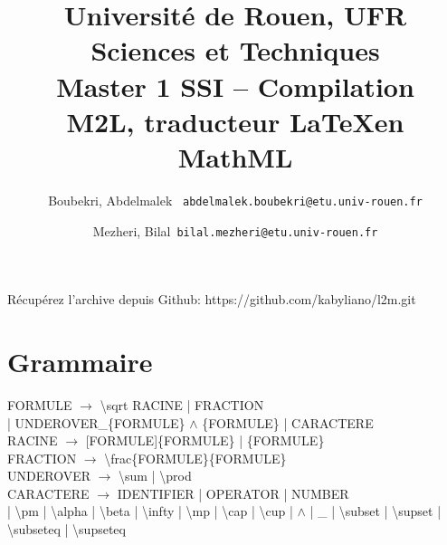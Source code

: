 \documentclass[12pt,a4paper]{article}
\author{
	Boubekri, Abdelmalek \     \texttt{abdelmalek.boubekri@etu.univ-rouen.fr}
	\and
	Mezheri, Bilal\   		   \texttt{bilal.mezheri@etu.univ-rouen.fr}
}
\title{	Université de Rouen, UFR Sciences et Techniques\\
		Master 1 SSI – Compilation\\
		M2L, traducteur \LaTeX en MathML\\ }
\begin{document}
	
	\maketitle

Récupérez l'archive depuis Github: https://github.com/kabyliano/l2m.git

\section*{Grammaire}

FORMULE 	$\rightarrow$ \textbackslash sqrt RACINE | FRACTION \\
 
 | UNDEROVER\_\{FORMULE\} $\wedge$ \{FORMULE\} | CARACTERE\\
 
RACINE		$\rightarrow$ [FORMULE]\{FORMULE\} | \{FORMULE\}\\

FRACTION	$\rightarrow$ \textbackslash frac\{FORMULE\}\{FORMULE\}\\

UNDEROVER	$\rightarrow$ \textbackslash sum | \textbackslash prod \\

CARACTERE	$\rightarrow$ IDENTIFIER | OPERATOR | NUMBER\\
 | \textbackslash pm | \textbackslash alpha | \textbackslash beta | \textbackslash infty |  \textbackslash mp | \textbackslash cap | \textbackslash cup | $\wedge$ | \_ | \textbackslash subset  | \textbackslash supset  | \textbackslash subseteq | \textbackslash supseteq


	
\end{document}
